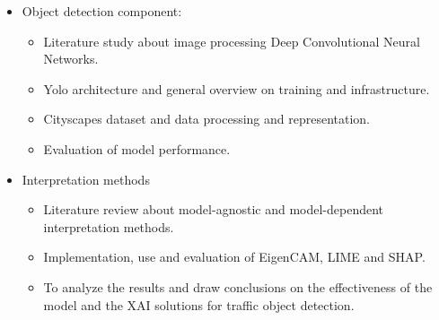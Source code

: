 \begin{itemize}
    \item Object detection component:
    \begin{itemize}
        \item Literature study about image processing Deep Convolutional Neural Networks.
        \item Yolo architecture and general overview on training and infrastructure.
        \item Cityscapes dataset and data processing and representation.
        \item Evaluation of model performance.
    \end{itemize}
    \item Interpretation methods
    \begin{itemize}
        \item Literature review about model-agnostic and model-dependent interpretation methods.
        \item Implementation, use and evaluation of EigenCAM, LIME and SHAP\@.
        \item To analyze the results and draw conclusions on the effectiveness of the model and the XAI solutions for traffic object detection.
    \end{itemize}
\end{itemize}
